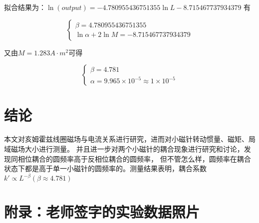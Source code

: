 \documentclass{article}
\begin{document}
拟合结果为：$\ln(output)=-4.780955436751355\ln L-8.715467737934379$
有

$$\begin{cases}
    \beta=4.780955436751355 \\
    \ln \alpha+2\ln M=-8.715467737934379
\end{cases}$$

又由$M=1.283A\cdot m^2$可得

$$\begin{cases}
    \beta=4.781 \\
    \alpha=9.965\times 10^{-5} \approx 1\times 10^{-5}
\end{cases}$$

\section{结论}
本文对亥姆霍兹线圈磁场与电流关系进行研究，进而对小磁针转动惯量、磁矩、局域磁场大小进行测量。
并且进一步对两个小磁针的耦合现象进行研究和讨论，发现同相位耦合的圆频率高于反相位耦合的圆频率，
但不管怎么样，圆频率在耦合状态下都是高于单一小磁针的圆频率的。测量结果表明，耦合系数$k'\propto L^{-\beta}(\beta \approx4.781)$

\newpage
\section*{附录：老师签字的实验数据照片}


\end{document}

